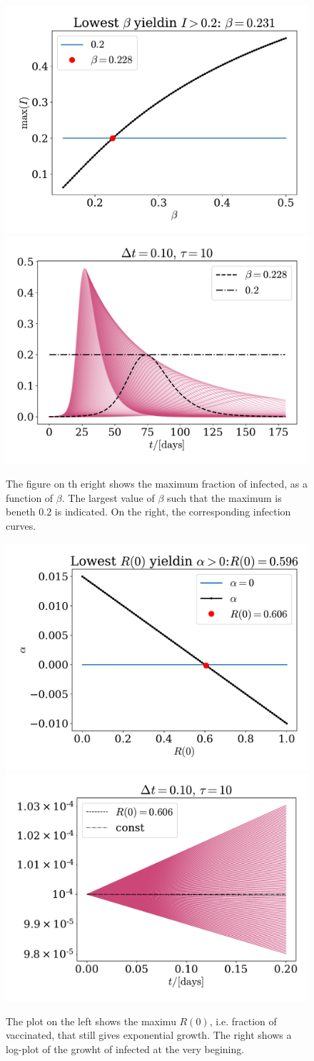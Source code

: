 \documentclass{article}
\begin{document}
    \begin{figure}[H]
        \centering
        \includegraphics[width=.49\textwidth]{../plots/2A/flatten.pdf}
        \includegraphics[width=.49\textwidth]{../plots/2A/flattenIs.pdf}
        \caption{The figure on th eright shows the maximum fraction of infected, as a function of $\beta$. The largest value of $\beta$ such that the maximum is beneth $0.2$ is indicated. On the right, the corresponding infection curves.}
        \label{flattening}
    \end{figure}

    \begin{figure}[H]
        \centering
        \includegraphics[width=.49\textwidth]{../plots/2A/vax.pdf}
        \includegraphics[width=.49\textwidth]{../plots/2A/vax_R.pdf}
        \caption{The plot on the left shows the maximu $R(0)$, i.e. fraction of vaccinated, that still gives exponential growth. The right shows a log-plot of the growht of infected at the very begining.}
        \label{vax}
    \end{figure}
\end{document}
